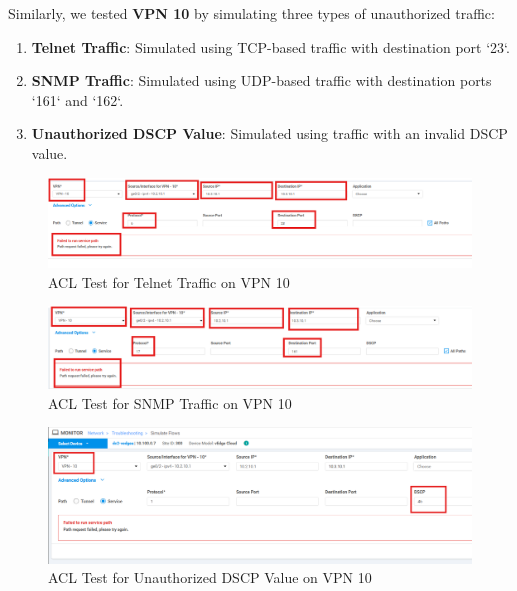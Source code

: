 \documentclass[12pt,english]{report}
\begin{document}
Similarly, we tested \textbf{VPN 10} by simulating three types of unauthorized traffic:
\begin{enumerate}
    \item \textbf{Telnet Traffic}: Simulated using TCP-based traffic with destination port `23`.
    \item \textbf{SNMP Traffic}: Simulated using UDP-based traffic with destination ports `161` and `162`.
    \item \textbf{Unauthorized DSCP Value}: Simulated using traffic with an invalid DSCP value.
\end{enumerate}

\begin{figure}[H]
    \centering
    \includegraphics[width=1\textwidth]{chapter 4/jdid/vpn10_telnet.png}
    \caption{ACL Test for Telnet Traffic on VPN 10}
    \label{fig:acl_test_vpn10_telnet}
\end{figure}

\begin{figure}[H]
    \centering
    \includegraphics[width=1\textwidth]{chapter 4/jdid/vpn10_snmp.png}
    \caption{ACL Test for SNMP Traffic on VPN 10}
    \label{fig:acl_test_vpn10_snmp}
\end{figure}

\begin{figure}[H]
    \centering
    \includegraphics[width=1\textwidth]{chapter 4/jdid/vpn10_wrdscp.png}
    \caption{ACL Test for Unauthorized DSCP Value on VPN 10}
    \label{fig:acl_test_vpn10_dscp}
\end{figure}
\end{document}
